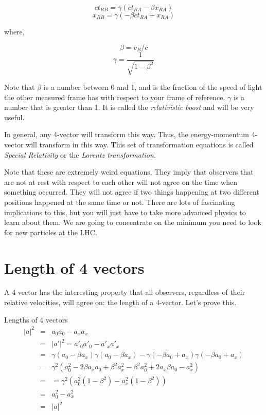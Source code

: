 \begin{equation} ct_{RB} = \gamma(ct_{RA} - \beta x_{RA}) \end{equation} 
\begin{equation}  x_{RB} = \gamma(- \beta ct_{RA} + x_{RA}) 	 \end{equation} 

\noindent where,

\begin{equation} \beta = v_B /c \end{equation}   	
\begin{equation} \gamma = \frac{1}{\sqrt{1- \beta^2}} \end{equation}  


Note that $\beta$  is a number between 0 and 1, and is the fraction of the speed of light the other measured frame has with respect to your frame of reference.  $\gamma$  is a number that is greater than 1.  It is called the {\it relativistic boost} and will be very useful.

In general, any 4-vector will transform this way.  Thus, the energy-momentum 4-vector will transform in this way.  This set of transformation equations is called {\it Special Relativity} or the {\it Lorentz transformation}.

Note that these are extremely weird equations.  They imply that observers that are not at rest with respect to each other will not agree on the time when something occurred. They will not agree if two things happening at two different positions happened at the same time or not.  There are lots of fascinating implications to this, but you will just have to take more advanced physics to learn about them.  We are going to concentrate on the minimum you need to look for new particles at the LHC.

\section{Length of 4 vectors}

A 4 vector has the interesting property that all observers, regardless of their relative velocities, will agree on: the length of a 4-vector.  Let's prove this. 

Lengths of 4 vectors
\begin{eqnarray}
|a|^2 &=&  a_0 a_0 - a_x a_x  \nonumber \\
      &=&  |a'|^2 = a'_0 a'_0 - a'_x a'_x  \nonumber \\
      &=& \gamma (a_0 -\beta a_x) \gamma (a_0 -\beta a_x) - \gamma (-\beta a_0 +a_x ) \gamma (-\beta a_0 +a_x )  \nonumber \\
      &=&  \gamma^2 (a_0^2  -2 \beta a_x a_0  + \beta^2 a_x^2 - \beta^2 a_0^2  + 2 a_x \beta  a_0  - a_x^2)   \nonumber \\
      &=& =\gamma^2 ( a_0^2 (1-  \beta^2)  - a_x^2 (1-  \beta^2))   \nonumber \\
      &=&  a_0^2 - a_x^2  \nonumber  \\
      &=& |a|^2  
\end{eqnarray} 

